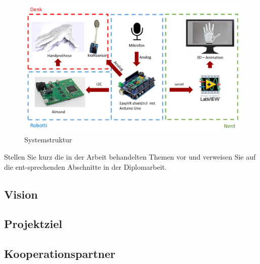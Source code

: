 \documentclass[12pt]{article}
\begin{document}
\begin{figure}[h]
    \includegraphics[width=1\textwidth]{Systemstruktur.png}
    \centering
    \caption{Systemstruktur}
    \label{Systemstruktur}
\end{figure}

Stellen Sie kurz die in der Arbeit behandelten Themen vor und verweisen Sie auf die ent-sprechenden Abschnitte in der Diplomarbeit.\\
\color{black}

\subsection{Vision}
\subsection{Projektziel}
\subsection{Kooperationspartner}

\newpage
\end{document}
